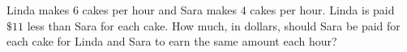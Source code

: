 Linda makes $6$ cakes per hour and Sara makes $4$ cakes per hour. Linda is paid $\$11$ less than Sara for each cake. How much, in dollars, should Sara be paid for each cake for Linda and Sara to earn the same amount each hour?
